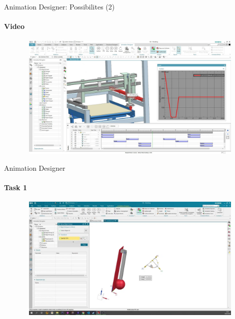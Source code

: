 \documentclass[aspectratio=169]{beamer}
\begin{document}
\begin{frame}[t]{Animation Designer: Possibilites (2)}
    \framesubtitle{Video}
    \vspace{-0.6cm}
    \begin{figure}[H]
        \href{https://youtu.be/mlrptDMu42o}{
            \centering\includegraphics[height=6cm,width=1\textwidth,keepaspectratio]{anim_video2_preview.jpg}}
        \label{fig:anim_video2_preview.jpg}
    \end{figure}
\end{frame}

\begin{frame}[t]{Animation Designer}
    \framesubtitle{Task 1}
    \vspace{-0.6cm}
    \begin{figure}[H]
        \href{https://disk.yandex.ru/i/Jn6CjUOzpJXqhg}{
            \centering\includegraphics[height=6cm,width=1\textwidth,keepaspectratio]{anim_video_preview.png}}
        \label{fig:anim_video_preview.png}
    \end{figure}
\end{frame}
\end{document}
